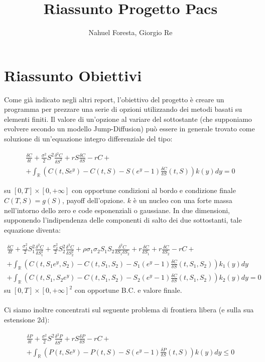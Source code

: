 \documentclass[a4paper,10pt]{article}
\title{Riassunto Progetto Pacs}
\author{Nahuel Foresta, Giorgio Re}
\newcommand{\der}[2]{\frac{\delta #1}{\delta #2}}
\newcommand{\dder}[2]{\frac{\delta^2 #1}{\delta #2^2}}
\newcommand{\dmix}[3]{\frac{\delta^2 #1}{\delta #2 \delta #3}}
\begin{document}
\maketitle

\section{Riassunto Obiettivi}

Come gi\`a indicato negli altri report, l'obiettivo del progetto è creare un programma per prezzare una serie di opzioni utilizzando dei metodi basati su elementi finiti. Il valore di un'opzione al variare del sottostante (che supponiamo evolvere secondo un modello Jump-Diffusion) può essere in generale trovato come soluzione di un'equazione integro differenziale del tipo:

\begin{multline}
\der{C}{t}+\frac{\sigma^2}{2}S^2\dder{C}{S}+rS\der{C}{S}-rC+\\+ \int_\mathbb{R}\left(C(t,Se^y)-C(t,S)-S(e^y-1)\der{C}{S}(t,S)\right)k(y)dy=0
\label{eq:1d}
\end{multline}

su $[0,T]\times[0,+\infty]$ con opportune condizioni al bordo e condizione finale $C(T,S)=g(S)$, payoff dell'opzione. $k$ è un nucleo con una forte massa nell'intorno dello zero e code esponenziali o gaussiane.
In due dimensioni, supponendo l'indipendenza delle componenti di salto dei due sottostanti, tale equazione diventa:

\begin{multline}
 \der{C}{t}+\frac{\sigma_1^2}{2}S_1^2\dder{C}{S_1}+\frac{\sigma_2^2}{2}S_2^2\dder{C}{S_2}+\rho\sigma_1\sigma_2 S_1 S_2 \dmix{C}{S_1}{S_2}+
 r\der{C}{S_1}+r\der{C}{S_2}-rC+ \\
 + \int_\mathbb{R}\left(C(t,S_1e^{y},S_2)-C(t,S_1,S_2)-S_1(e^y-1)\der{C}{S}(t,S_1,S_2)\right)k_1(y)dy\\
 + \int_\mathbb{R}\left(C(t,S_1,S_2e^{y})-C(t,S_1,S_2)-S_2(e^y-1)\der{C}{S}(t,S_1,S_2)\right)k_2(y)dy=0
\label{eq:2d}
\end{multline}
su $[0,T]\times[0,+\infty]^2$ con opportune B.C. e valore finale.
\\\\
Ci siamo inoltre concentrati sul seguente problema di frontiera libera (e sulla sua estensione 2d):

\begin{multline}
\der{P}{t}+\frac{\sigma^2}{2}S^2\dder{P}{S}+rS\der{P}{S}-rC+\\+ \int_\mathbb{R}\left(P(t,Se^y)-P(t,S)-S(e^y-1)\der{P}{S}(t,S)\right)k(y)dy\leq0
\label{eq:usa1d}
\end{multline}
\end{document}
